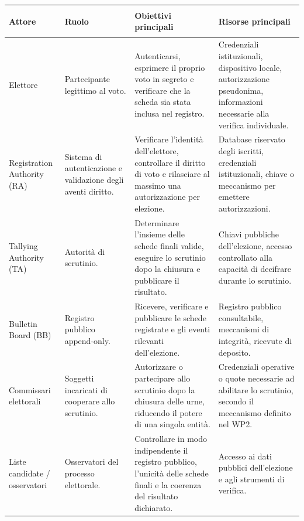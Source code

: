 \documentclass[12pt,a4paper]{article}
\begin{document}
\begin{small}
\begin{longtable}{>{\bfseries\raggedright}p{2.8cm} p{3.2cm} p{3.5cm} p{3.5cm}}
\toprule
Attore & Ruolo & Obiettivi principali & Risorse principali \\
\midrule
\endhead
Elettore &
Partecipante legittimo al voto. &
Autenticarsi, esprimere il proprio voto in segreto e verificare che la scheda sia stata inclusa nel registro. &
Credenziali istituzionali, dispositivo locale, autorizzazione pseudonima, informazioni necessarie alla verifica individuale. \\
\midrule
Registration Authority (RA) &
Sistema di autenticazione e validazione degli aventi diritto. &
Verificare l'identit\`a dell'elettore, controllare il diritto di voto e rilasciare al massimo una autorizzazione per elezione. &
Database riservato degli iscritti, credenziali istituzionali, chiave o meccanismo per emettere autorizzazioni. \\
\midrule
Tallying Authority (TA) &
Autorit\`a di scrutinio. &
Determinare l'insieme delle schede finali valide, eseguire lo scrutinio dopo la chiusura e pubblicare il risultato. &
Chiavi pubbliche dell'elezione, accesso controllato alla capacit\`a di decifrare durante lo scrutinio. \\
\midrule
Bulletin Board (BB) &
Registro pubblico append-only. &
Ricevere, verificare e pubblicare le schede registrate e gli eventi rilevanti dell'elezione. &
Registro pubblico consultabile, meccanismi di integrit\`a, ricevute di deposito. \\
\midrule
Commissari elettorali &
Soggetti incaricati di cooperare allo scrutinio. &
Autorizzare o partecipare allo scrutinio dopo la chiusura delle urne, riducendo il potere di una singola entit\`a. &
Credenziali operative o quote necessarie ad abilitare lo scrutinio, secondo il meccanismo definito nel WP2. \\
\midrule
Liste candidate / osservatori &
Osservatori del processo elettorale. &
Controllare in modo indipendente il registro pubblico, l'unicit\`a delle schede finali e la coerenza del risultato dichiarato. &
Accesso ai dati pubblici dell'elezione e agli strumenti di verifica. \\
\bottomrule
\end{longtable}
\end{small}
\end{document}
